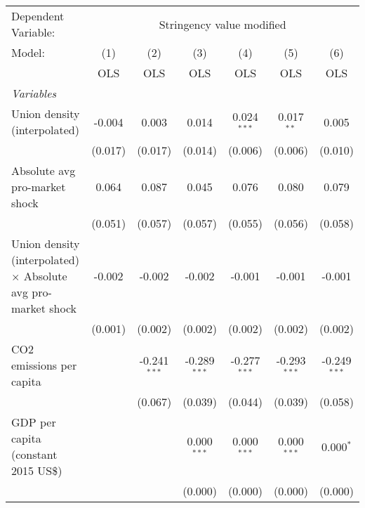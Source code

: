 
\begingroup
\centering
\begin{tabular}{lcccccc}
   \toprule
   Dependent Variable: & \multicolumn{6}{c}{Stringency value modified}\\
   Model:                                                               & (1)     & (2)            & (3)            & (4)            & (5)            & (6)\\  
                                                                        &  OLS    & OLS            & OLS            & OLS            & OLS            & OLS\\  
   \midrule
   \emph{Variables}\\
   Union density (interpolated)                                         & -0.004  & 0.003          & 0.014          & 0.024$^{***}$  & 0.017$^{**}$   & 0.005\\   
                                                                        & (0.017) & (0.017)        & (0.014)        & (0.006)        & (0.006)        & (0.010)\\   
   Absolute avg pro-market shock                                        & 0.064   & 0.087          & 0.045          & 0.076          & 0.080          & 0.079\\   
                                                                        & (0.051) & (0.057)        & (0.057)        & (0.055)        & (0.056)        & (0.058)\\   
   Union density (interpolated) $\times$ Absolute avg pro-market shock  & -0.002  & -0.002         & -0.002         & -0.001         & -0.001         & -0.001\\   
                                                                        & (0.001) & (0.002)        & (0.002)        & (0.002)        & (0.002)        & (0.002)\\   
   CO2 emissions per capita                                             &         & -0.241$^{***}$ & -0.289$^{***}$ & -0.277$^{***}$ & -0.293$^{***}$ & -0.249$^{***}$\\   
                                                                        &         & (0.067)        & (0.039)        & (0.044)        & (0.039)        & (0.058)\\   
   GDP per capita (constant 2015 US\$)                                  &         &                & 0.000$^{***}$  & 0.000$^{***}$  & 0.000$^{***}$  & 0.000$^{*}$\\   
                                                                        &         &                & (0.000)        & (0.000)        & (0.000)        & (0.000)\\   

\end{tabular}
